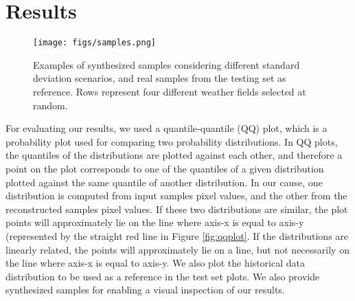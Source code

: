 \documentclass{article}
\begin{document}
\begin{table}[h!]
	\centering
	\caption{Architecture of the networks. Down-sampling is performed in conv 1-1 and conv 1-2 and up-sampling is performed in convt 2-1 and convt 2-2, with a stride of 2.}
	\vspace{5pt}
    \label{tab:architecture}
\end{table}


\section{Results}

\begin{figure*}[h!]
	\centering
		\texttt{[image: figs/samples.png]}
	\caption{Examples of synthesized samples considering different standard deviation scenarios, and real samples from the testing set as reference. Rows represent four different weather fields selected at random.}
	\label{fig:samples}
\end{figure*} 

For evaluating our results, we used a quantile-quantile (QQ) plot, which is a probability plot used for comparing two probability distributions. In QQ plots, the quantiles of the distributions are plotted against each other, and therefore a point on the plot corresponds to one of the quantiles of a given distribution plotted against the same quantile of another distribution. In our cause, one distribution is computed from input samples pixel values, and the other from the reconstructed samples pixel values. If these two distributions are similar, the plot points will approximately lie on the line where axis-x is equal to axis-y (represented by the straight red line in Figure \ref{fig:qqplot}. If the distributions are linearly related, the points will approximately lie on a line, but not necessarily on the line where axis-x is equal to axis-y. We also plot the historical data distribution to be used as a reference in the test set plots. We also provide synthesized samples for enabling a visual inspection of our results.
\end{document}
